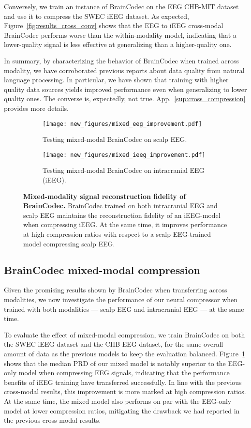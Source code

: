 \documentclass{article} %
\begin{document}
Conversely, we train an instance of BrainCodec on the EEG CHB-MIT dataset and use it to compress the SWEC iEEG dataset. As expected, Figure~\ref{fig:results_cross_conv} shows that the EEG to iEEG cross-modal BrainCodec performs worse than the within-modality model, indicating that a lower-quality signal is less effective at generalizing than a higher-quality one.

In summary, by characterizing the behavior of BrainCodec when trained across modality, we have corroborated previous reports about data quality from natural language processing. In particular, we have shown that training with higher quality data sources yields improved performance even when generalizing to lower quality ones. The converse is, expectedly, not true. App.~\ref{sup:cross_compression} provides more details. 

\begin{figure}[h]
	\begin{subfigure}[t]{.49\textwidth}
		\centering
		\texttt{[image: new\_figures/mixed\_eeg\_improvement.pdf]}
		\caption{Testing mixed-modal BrainCodec on scalp EEG.}
		\label{fig:results_mixed}
	\end{subfigure}\hfill
	\begin{subfigure}[t]{.49\textwidth}
		\centering
		\texttt{[image: new\_figures/mixed\_ieeg\_improvement.pdf]}
		\caption{Testing mixed-modal BrainCodec on intracranial EEG (iEEG).}
		\label{fig:results_mixed_conv}
	\end{subfigure}
	\caption{\textbf{Mixed-modality signal reconstruction fidelity of BrainCodec.} BrainCodec trained on both intracranial EEG and scalp EEG maintains the reconstruction fidelity of an iEEG-model when compressing iEEG. At the same time, it improves performance at high compression ratios with respect to a scalp EEG-trained model compressing scalp EEG.}
\end{figure}

\subsection{BrainCodec mixed-modal compression}

Given the promising results shown by BrainCodec when transferring across modalities, we now investigate the performance of our neural compressor when trained with both modalities --- scalp EEG and intracranial EEG --- at the same time.

To evaluate the effect of mixed-modal compression, we train BrainCodec on both the SWEC iEEG dataset and the CHB EEG dataset, for the same overall amount of data as the previous models to keep the evaluation balanced. Figure~\ref{fig:results_mixed} shows that the median PRD of our mixed model is notably superior to the EEG-only model when compressing EEG signals, indicating that the performance benefits of iEEG training have transferred successfully. In line with the previous cross-modal results, this improvement is more marked at high compression ratios. At the same time, the mixed model also performs on par with the EEG-only model at lower compression ratios, mitigating the drawback we had reported in the previous cross-modal results.
\end{document}
